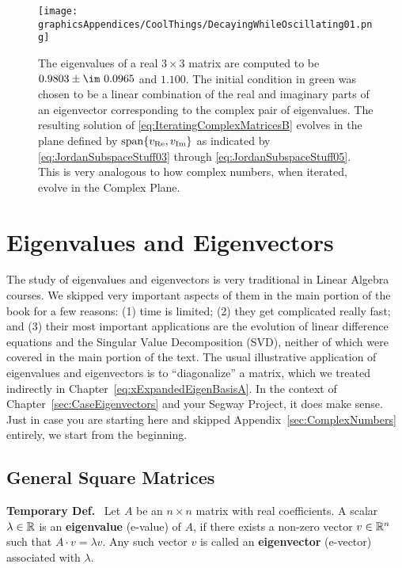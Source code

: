 \vspace*{0.2cm}



\begin{figure}[htb!]
\centering
\texttt{[image: graphicsAppendices/CoolThings/DecayingWhileOscillating01.png]}
\caption[]{The eigenvalues of a real $3 \times 3$ matrix are computed to be $0.9803 \pm \im~ 0.0965$ and $ 1.100$. The initial condition in green was chosen to be a linear combination of the real and imaginary parts of an eigenvector corresponding to the complex pair of eigenvalues. The resulting solution of \eqref{eq:IteratingComplexMatricesB} evolves in the plane defined by $\mathrm{span} \{ v_{\rm Re}, v_{\rm Im} \}$ as indicated by  \eqref{eq:JordanSubspaceStuff03} through \eqref{eq:JordanSubspaceStuff05}. This is very analogous to how complex numbers, when iterated, evolve in the Complex Plane.}
\label{fig:SpanRealImaginaryParts}
\end{figure}


\section{Eigenvalues and Eigenvectors}
\label{sec:EigenStuff}

The study of eigenvalues and eigenvectors is very traditional in Linear Algebra courses. We skipped very important aspects of them in the main portion of the book for a few reasons: (1) time is limited; (2) they get complicated really fast; and (3) their most important applications are the evolution of linear difference equations and the Singular Value Decomposition (SVD), neither of which were covered in the main portion of the text. The usual illustrative application of eigenvalues and eigenvectors is to ``diagonalize'' a matrix, which we treated indirectly in Chapter~\ref{eq:xExpandedEigenBasisA}. In the context of Chapter~\ref{sec:CaseEigenvectors} and your Segway Project, it does make sense. \\

Just in case you are starting here and skipped Appendix~\ref{sec:ComplexNumbers} entirely, we start from the beginning.

\subsection{General Square Matrices}

\textbf{Temporary Def.}~ Let $A$ be an $n\times n$ matrix with real coefficients. A scalar $\lambda \in \mathbb R$ is an \textbf{eigenvalue} (e-value) of $A$, if there exists a non-zero vector $v \in \mathbb R^{n}$ such that $A \cdot v=\lambda v$. Any such vector $v$ is called an \textbf{eigenvector} (e-vector) associated with $\lambda$.\\

